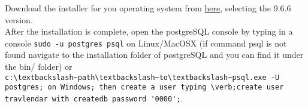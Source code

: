 Download the installer for you operating system from \href{https://www.enterprisedb.com/downloads/postgres-postgresql-downloads#linux}{here}, selecting the 9.6.6 version. \\
After the installation is complete, open the postgreSQL console by typing in a console \verb;sudo -u postgres psql; on Linux/MacOSX (if command psql is not found navigate to the installation folder of postgreSQL and you can find it under the bin/ folder) or \verb+c:\textbackslash~path\textbackslash~to\textbackslash~psql.exe -U postgres; on Windows; then create a user typing \verb;create user travlendar with createdb password '0000';+.